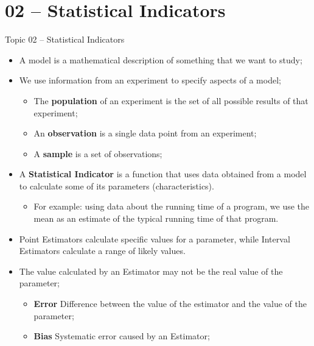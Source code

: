 \section{02 -- Statistical Indicators}

\begin{frame}[t]{Topic 02 -- Statistical Indicators}

  \begin{itemize}
    \item A model is a mathematical description of something that we want to study;
    \item We use information from an experiment to specify aspects of a model;
    \begin{itemize}
      \item The {\bf population} of an experiment is the set of all possible results of that experiment;
      \item An {\bf observation} is a single data point from an experiment;
      \item A {\bf sample} is a set of observations;
    \end{itemize}
    \item A {\bf Statistical Indicator} is a function that uses data obtained from a model to calculate some of its parameters (characteristics).
    \begin{itemize}
      \item For example: using data about the running time of a program, we use the mean as an estimate of the typical running time of that program.
    \end{itemize}
    \item Point Estimators calculate specific values for a parameter, while Interval Estimators calculate a range of likely values.
    \item The value calculated by an Estimator may not be the real value of the parameter;
    \begin{itemize}
      \item {\bf Error} Difference between the value of the estimator and the value of the parameter;
      \item {\bf Bias} Systematic error caused by an Estimator;
    \end{itemize}
  \end{itemize}

\end{frame}

